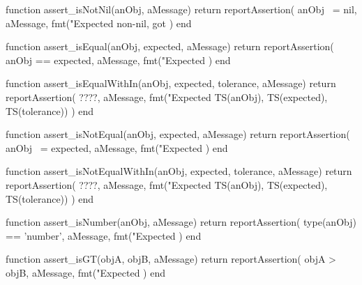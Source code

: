 \startLuaCode
function assert_isNotNil(anObj, aMessage)
  return reportAssertion(
    anObj ~= nil,
    aMessage,
    fmt("Expected non-nil, got %
  )
end
\stopLuaCode

\stopTestSuite

\startTestSuite[title=assert_isEqual]

\startLuaCode
function assert_isEqual(anObj, expected, aMessage)
  return reportAssertion(
    anObj == expected,
    aMessage,
    fmt("Expected %
  )
end
\stopLuaCode

\stopTestSuite

\startTestSuite[title=assert_isEqualWithIn]

\startLuaCode
function assert_isEqualWithIn(anObj, expected, tolerance, aMessage)
  return reportAssertion(
    ????,
    aMessage,
    fmt("Expected %
      TS(anObj), TS(expected), TS(tolerance))
  )
end
\stopLuaCode

\stopTestSuite

\startTestSuite[title=assert_isNotEqual]

\startLuaCode
function assert_isNotEqual(anObj, expected, aMessage)
  return reportAssertion(
    anObj ~= expected,
    aMessage,
    fmt("Expected %
  )
end
\stopLuaCode

\stopTestSuite

\startTestSuite[title=assert_isNotEqualWithIn]
\startLuaCode
function assert_isNotEqualWithIn(anObj, expected, tolerance, aMessage)
  return reportAssertion(
    ????,
    aMessage,
    fmt("Expected %
      TS(anObj), TS(expected), TS(tolerance))
  )
end
\stopLuaCode

\stopTestSuite

\startTestSuite[title=assert_isNumber]

\startLuaCode
function assert_isNumber(anObj, aMessage)
  return reportAssertion(
    type(anObj) == 'number',
    aMessage,
    fmt("Expected %
  )
end
\stopLuaCode

\stopTestSuite

\startTestSuite[title=assert_isGT]

\startLuaCode
function assert_isGT(objA, objB, aMessage)
  return reportAssertion(
    objA > objB,
    aMessage,
    fmt("Expected %
  )
end
\stopLuaCode

\stopTestSuite

